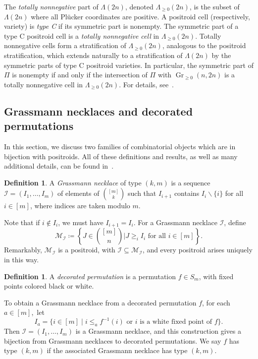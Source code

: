\documentclass[10pt]{amsart}
\theoremstyle{definition}
\newtheorem{defi}[theo]{Definition}
\DeclareMathOperator{\Gr}{Gr}
\newcommand{\Lm}{\Lambda}
\begin{document}
The \emph{totally nonnegative} part of $\Lm(2n)$, denoted $\Lm_{\geq 0}(2n)$, is the subset of $\Lm(2n)$ where all Pl{\"u}cker coordinates are positive. A positroid cell (respectively, variety) is \emph{type C} if its symmetric part is nonempty. The symmetric part of a type C positroid cell is a \emph{totally nonnegative cell} in $\Lm_{\geq 0}(2n)$. Totally nonnegative cells form a stratification of $\Lm_{\geq 0}(2n)$, analogous to the positroid stratification, which extends naturally to a stratification of $\Lm(2n)$ by the symmetric parts of type C positroid varieties. In particular, the symmetric part of $\Pi$ is nonempty if and only if the intersection of $\Pi$ with $\Gr_{\geq 0}(n,2n)$ is a totally nonnegative cell in $\Lm_{\geq 0}(2n)$. For details, see~\cite{Kar18}. 

\subsection{Grassmann necklaces and decorated permutations}

In this section, we discuss two families of combinatorial objects which are in bijection with positroids. All of these definitions and results, as well as many additional details, can be found in~\cite{Pos06}.

\begin{defi}
A \emph{Grassmann necklace} of type $(k,m)$ is a sequence
$\mathcal{I} = (I_1,\ldots,I_m)$ of elements of $\binom{[m]}{k}$ such that $I_{i+1}$ contains $I_i \backslash \{i\}$ for all $i \in [m]$, where indices are taken modulo $m$.
\end{defi}

Note that if $i \not\in I_{i}$, we must have $I_{i+1} = I_i$. 
For a Grassmann necklace $\mathcal{I}$, define
\[\mathcal{M}_{\mathcal{I}} \coloneqq \left\{%
J \in \binom{[m]}{n} \mathrel{\Bigg|} J \geq_i I_i \text{ for all }i \in [m]\right\}.\]
Remarkably, $\mathcal{M}_{\mathcal{I}}$ is a positroid, with $\mathcal{I} \subseteq \mathcal{M}_{\mathcal{I}}$, and every positroid arises uniquely in this way. 

\begin{defi}
A \emph{decorated permutation} is a permutation $f \in S_m$, with fixed points colored black or white. 
\end{defi}

To obtain a Grassmann necklace from a decorated permutation $f$, for each $a \in [m]$,~let
\[I_a = \{i \in [m] \mid i \leq_a f^{-1}(i) \text{ or $i$ is a white fixed point of $f$} \}.\]
Then $\mathcal{I} = (I_1,\ldots,I_m)$ is a Grassmann necklace, and this construction gives a bijection from Grassmann necklaces to decorated permutations. We say $f$ has type $(k,m)$ if the associated Grassmann necklace has type $(k,m)$.
\end{document}
